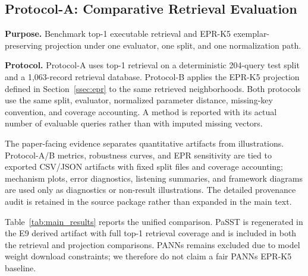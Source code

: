 \subsection{Protocol-A: Comparative Retrieval Evaluation}
\label{ssec:protocolA}

\textbf{Purpose.} Benchmark top-1 executable retrieval and EPR-K5 exemplar-preserving projection under one evaluator, one split, and one normalization path.

\textbf{Protocol.} Protocol-A uses top-1 retrieval on a deterministic 204-query test split and a 1,063-record retrieval database. Protocol-B applies the EPR-K5 projection defined in Section~\ref{ssec:epr} to the same retrieved neighborhoods. Both protocols use the same split, evaluator, normalized parameter distance, missing-key convention, and coverage accounting. A method is reported with its actual number of evaluable queries rather than with imputed missing vectors.

The paper-facing evidence separates quantitative artifacts from illustrations. Protocol-A/B metrics, robustness curves, and EPR sensitivity are tied to exported CSV/JSON artifacts with fixed split files and coverage accounting; mechanism plots, error diagnostics, listening summaries, and framework diagrams are used only as diagnostics or non-result illustrations. The detailed provenance audit is retained in the source package rather than expanded in the main text.

Table~\ref{tab:main_results} reports the unified comparison. PaSST is regenerated in the E9 derived artifact with full top-1 retrieval coverage and is included in both the retrieval and projection comparisons. PANNs remains excluded due to model weight download constraints; we therefore do not claim a fair PANNs EPR-K5 baseline.


